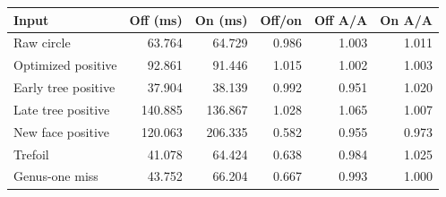 \begin{tabular}{lrrrrr}
\toprule
Input & Off (ms) & On (ms) & Off/on & Off A/A & On A/A \\
\midrule
Raw circle & 63.764 & 64.729 & 0.986 & 1.003 & 1.011 \\
Optimized positive & 92.861 & 91.446 & 1.015 & 1.002 & 1.003 \\
Early tree positive & 37.904 & 38.139 & 0.992 & 0.951 & 1.020 \\
Late tree positive & 140.885 & 136.867 & 1.028 & 1.065 & 1.007 \\
New face positive & 120.063 & 206.335 & 0.582 & 0.955 & 0.973 \\
Trefoil & 41.078 & 64.424 & 0.638 & 0.984 & 1.025 \\
Genus-one miss & 43.752 & 66.204 & 0.667 & 0.993 & 1.000 \\
\bottomrule
\end{tabular}
